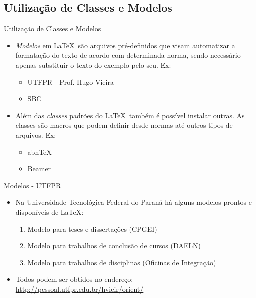 \subsection{Utilização de Classes e Modelos}
\begin{frame}{Utilização de Classes e Modelos}

  \begin{itemize}
    \item \textit{Modelos} em \LaTeX\ são arquivos pré-definidos que visam automatizar a formatação do texto de acordo com determinada norma, sendo necessário apenas substituir o texto do exemplo pelo seu. Ex:
    \begin{itemize}
    \item UTFPR - Prof. Hugo Vieira
    \item SBC
    \end{itemize}

    \vspace{0.5cm}
    
    \item Além das \textit{classes} padrões do \LaTeX\ também é possível instalar outras. As classes são macros que podem definir desde normas até outros tipos de arquivos. Ex:
    \begin{itemize}
    \item abn\TeX
    \item Beamer
    \end{itemize}
    
    \end{itemize}
\end{frame}

\begin{frame}{Modelos - UTFPR}
 
    \begin{itemize}
    \item Na Universidade Tecnológica Federal do Paraná há alguns modelos prontos e disponíveis de \LaTeX:
        \begin{enumerate}
        \item Modelo para teses e dissertações (CPGEI) 
        \item Modelo para trabalhos de conclusão de cursos (DAELN) 
        \item Modelo para trabalhos de disciplinas (Oficinas de Integração) 
        \end{enumerate}
    \item Todos podem ser obtidos no endereço: \url{http://pessoal.utfpr.edu.br/hvieir/orient/}
    \end{itemize}

\end{frame}

